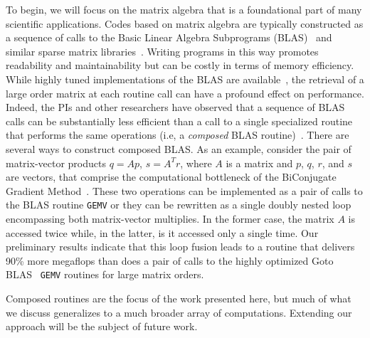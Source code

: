 \documentclass[11pt]{article}
\begin{document}
To begin, we will focus on the matrix algebra that is a foundational part of many scientific applications. Codes based on matrix algebra are typically constructed as a sequence of calls to the Basic Linear Algebra Subprograms (BLAS)~\cite{Dongarra:1988uq,Lawson:1979kx,Dongarra:1990fk} and similar sparse matrix libraries~\cite{Saad:fr,George:1981uq}. Writing programs in this way promotes readability and maintainability but can be costly in terms of memory efficiency. While highly tuned implementations of the BLAS are available~\cite{Bilmes:1997ye,Whaley:1998fk,IntelMath:oq,ESSL:kl,Goto:2006fk}, the retrieval of a large order matrix at each routine call can have a profound effect on performance. Indeed, the PIs and other researchers have observed that a sequence of BLAS calls can be substantially less efficient than a call to a single specialized routine that performs the same operations (i.e, a {\it composed} BLAS routine)~\cite{Ashby:uq,Blackford:2002vn,Stanley:CSD-98-992,baker03blgmres,baker03lgmres,Dennis:2005tg,Howell:2008,gropp01,Vuduc:2003kl}. There are several ways to construct composed BLAS. As an example, consider the pair of matrix-vector products
$q  = Ap$, $s  = A^Tr$, where $A$ is a matrix and $p$, $q$, $r$, and $s$ are vectors, that comprise the computational
bottleneck of the BiConjugate Gradient Method~\cite{Barrett:1994kx,Saad:2003fk}.  These two operations can be implemented as a pair of calls to the BLAS routine {\tt GEMV} or they can be rewritten as a single doubly nested loop encompassing both matrix-vector multiplies. In the former case, the matrix $A$ is accessed twice while, in the latter, is it accessed only a single time. Our preliminary results indicate that this loop fusion leads to a routine that delivers 90\% more megaflops than does a pair of calls to the highly optimized Goto BLAS~\cite{Goto:2006fk} {\tt GEMV} routines for large matrix orders.

Composed routines are the focus of the work presented here, but much of what we discuss generalizes to a much broader array of computations.   Extending our approach will be the subject of future work.



\end{document}
